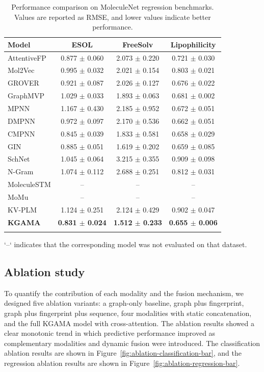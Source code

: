 \documentclass[webpdf,contemporary,large]{oup-authoring-template}%
\begin{document}
\begin{table}[t]
\caption{Performance comparison on MoleculeNet regression benchmarks. Values are reported as RMSE, and lower values indicate better performance.\label{tab:regression-results}}
\begin{tabular*}{\columnwidth}{@{\extracolsep{\fill}}lccc@{\extracolsep{\fill}}}
\toprule
Model & ESOL & FreeSolv & Lipophilicity \\
\midrule
AttentiveFP & 0.877 $\pm$ 0.060 & 2.073 $\pm$ 0.220 & 0.721 $\pm$ 0.030 \\
Mol2Vec & 0.995 $\pm$ 0.032 & 2.021 $\pm$ 0.154 & 0.803 $\pm$ 0.021 \\
GROVER & 0.921 $\pm$ 0.087 & 2.026 $\pm$ 0.127 & 0.676 $\pm$ 0.022 \\
GraphMVP & 1.029 $\pm$ 0.033 & 1.893 $\pm$ 0.063 & 0.681 $\pm$ 0.002 \\
MPNN & 1.167 $\pm$ 0.430 & 2.185 $\pm$ 0.952 & 0.672 $\pm$ 0.051 \\
DMPNN & 0.972 $\pm$ 0.097 & 2.170 $\pm$ 0.536 & 0.662 $\pm$ 0.051 \\
CMPNN & 0.845 $\pm$ 0.039 & 1.833 $\pm$ 0.581 & 0.658 $\pm$ 0.029 \\
GIN & 0.885 $\pm$ 0.051 & 1.619 $\pm$ 0.202 & 0.659 $\pm$ 0.085 \\
SchNet & 1.045 $\pm$ 0.064 & 3.215 $\pm$ 0.355 & 0.909 $\pm$ 0.098 \\
N-Gram & 1.074 $\pm$ 0.112 & 2.688 $\pm$ 0.251 & 0.812 $\pm$ 0.031 \\
MoleculeSTM & -- & -- & -- \\
MoMu & -- & -- & -- \\
KV-PLM & 1.124 $\pm$ 0.251 & 2.124 $\pm$ 0.429 & 0.902 $\pm$ 0.047 \\
\textbf{KGAMA} & \textbf{0.831 $\pm$ 0.024} & \textbf{1.512 $\pm$ 0.233} & \textbf{0.655 $\pm$ 0.006} \\
\botrule
\end{tabular*}
{\raggedright\footnotesize `--` indicates that the corresponding model was not evaluated on that dataset.\par}
\end{table}

\subsection{Ablation study}
To quantify the contribution of each modality and the fusion mechanism, we designed five ablation variants: a graph-only baseline, graph plus fingerprint, graph plus fingerprint plus sequence, four modalities with static concatenation, and the full KGAMA model with cross-attention. The ablation results showed a clear monotonic trend in which predictive performance improved as complementary modalities and dynamic fusion were introduced. The classification ablation results are shown in Figure~\ref{fig:ablation-classification-bar}, and the regression ablation results are shown in Figure~\ref{fig:ablation-regression-bar}.
\end{document}
